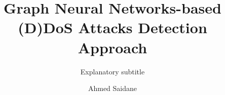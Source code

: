 \documentclass{layout/siccs-thesis}
\begin{document}
\frontmatter

\title{Graph Neural Networks-based (D)DoS Attacks Detection Approach}
\subtitle{Explanatory subtitle}
\author{Ahmed Saidane}
\firstsupervisor{}
\secondsupervisor{}









\tableofcontents
\listoffigures 
\listoftables    



\mainmatter






%
%








\newpage
\setcounter{secnumdepth}{-1}







\end{document}
